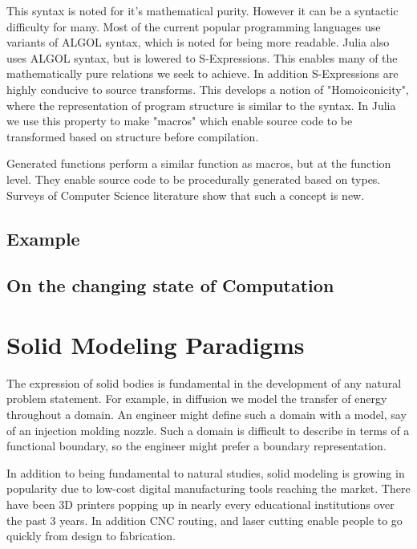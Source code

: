 \documentclass[a4paper]{article}
\begin{document}
This syntax is noted for it's mathematical purity.
However it can be a syntactic difficulty for many.
Most of the current popular programming languages
use variants of ALGOL syntax, which is noted for being more readable.
\cite{Hoare}
Julia also uses ALGOL syntax, but is lowered to S-Expressions. This enables
many of the mathematically pure relations we seek to achieve.
In addition S-Expressions are highly conducive to source transforms.
This develops a notion of "Homoiconicity", where the representation of
program structure is similar to the syntax. In Julia we use this property
to make "macros" which enable source code to be transformed based on
structure before compilation.

Generated functions perform a similar function as macros, but at the function
level. They enable source code to be procedurally generated based on types.
Surveys of Computer Science literature show that such a concept is new.


\subsection{Example}


\subsection{On the changing state of Computation}

\cite{Shamos_1999}

\section{Solid Modeling Paradigms}

The expression of solid bodies is fundamental in the development of any
natural problem statement. For example, in diffusion we model the transfer of
energy throughout a domain. An engineer might define such a domain with a
model, say of an injection molding nozzle. Such a domain is difficult to
describe in terms of a functional boundary, so the engineer might prefer
a boundary representation.

In addition to being fundamental to natural studies, solid modeling is growing
in popularity due to low-cost digital manufacturing tools reaching the market.
There have been 3D printers popping up in nearly every educational
institutions over the past 3 years. In addition CNC routing, and laser cutting
enable people to go quickly from design to fabrication.
\end{document}
